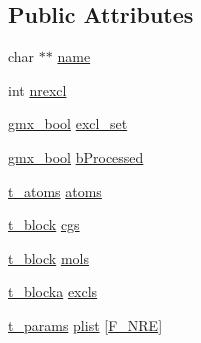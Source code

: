 \subsection*{\-Public \-Attributes}
\begin{DoxyCompactItemize}
\item 
char $\ast$$\ast$ \hyperlink{structt__molinfo_a4fd8705afd65d26665217edd90ebe33d}{name}
\item 
int \hyperlink{structt__molinfo_a1f23558de0275f615d9d5d344c453023}{nrexcl}
\item 
\hyperlink{include_2types_2simple_8h_a8fddad319f226e856400d190198d5151}{gmx\-\_\-bool} \hyperlink{structt__molinfo_ac41fa62a699da4ba6eadeecf820318ad}{excl\-\_\-set}
\item 
\hyperlink{include_2types_2simple_8h_a8fddad319f226e856400d190198d5151}{gmx\-\_\-bool} \hyperlink{structt__molinfo_adf14b2b3cdf1016ab48adea7cc31c6e1}{b\-Processed}
\item 
\hyperlink{structt__atoms}{t\-\_\-atoms} \hyperlink{structt__molinfo_aa830383e8592a00f3fae34fee91aa05a}{atoms}
\item 
\hyperlink{structt__block}{t\-\_\-block} \hyperlink{structt__molinfo_abae971d0139995725a28a759695581da}{cgs}
\item 
\hyperlink{structt__block}{t\-\_\-block} \hyperlink{structt__molinfo_ac24246ac0b771751d2c02aa282625008}{mols}
\item 
\hyperlink{structt__blocka}{t\-\_\-blocka} \hyperlink{structt__molinfo_a1a2dd3364b8fe496d57f35adfb9cc7d3}{excls}
\item 
\hyperlink{structt__params}{t\-\_\-params} \hyperlink{structt__molinfo_a9f8cfe4b08ca7a22a22ba340a078cf97}{plist} \mbox{[}\hyperlink{share_2template_2gromacs_2types_2idef_8h_aa52ea6a123f47db5e6b145e5fc5e369aa619bce9d967702fd746289c3f61269f2}{\-F\-\_\-\-N\-R\-E}\mbox{]}
\end{DoxyCompactItemize}


